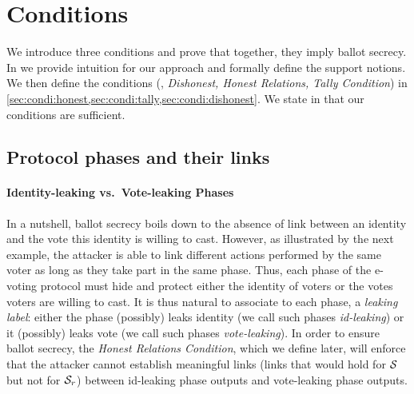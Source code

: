 

\section{Conditions}
\label{sec:conditions}
We introduce three conditions and prove that
together, they imply ballot secrecy. In  we
provide intuition for our approach and formally define the support notions.
We then define the conditions
(\ie,  {\em Dishonest, Honest Relations, Tally Condition}) in
\cref{sec:condi:honest,sec:condi:tally,sec:condi:dishonest}.
We state  in  that our conditions are
sufficient.


\newcommand{\ba}{\mathrm{ba}}
\newcommand{\openBal}{\mathrm{OpenHonBal}}
\newcommand{\openAllBal}{\mathrm{OpenBal}}



\subsection{Protocol phases and their links}
\label{sec:condi:tools}

\paragraph{\textbf{Identity-leaking vs.~Vote-leaking Phases}}
In a nutshell, ballot secrecy boils down to the absence of link between an identity and the vote this identity
is willing to cast. However, as illustrated by the next example, the attacker is able to link different actions
performed by the same voter as long as they take part in the same phase.
Thus, each phase of the e-voting protocol must hide and protect either the identity of voters
or the votes voters are willing to cast.
It is thus natural to associate to each phase, a {\em leaking label}:
either the phase (possibly) leaks identity (we call such phases {\em id-leaking})
or it (possibly) leaks vote (we call such phases {\em vote-leaking}).
In order to ensure ballot secrecy, the {\em Honest Relations Condition},
which we define later,
will enforce that the attacker cannot establish meaningful links
(\ie links that would hold for $\S$ but not for $\S_r$)
between id-leaking phase outputs and vote-leaking phase outputs.

